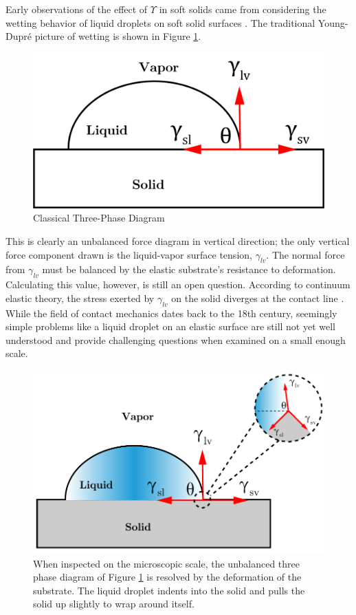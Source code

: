 Early observations of the effect of $ \Upsilon $ in soft solids came from considering the wetting behavior of liquid droplets on soft solid surfaces \cite{xu2017direct,jerison2011deformation,style2013universal,xu2018surface}. The traditional Young-Dupr\'{e} picture of wetting is shown in Figure \ref{fig:three-phase}.
\begin{figure}[h!]
	\centering
	\includegraphics[width=.6\textwidth]{Chapters/Figures/phase_diagram.PNG}
	\caption[Three-Phase Diagram]{Classical Three-Phase Diagram}
	\label{fig:three-phase} 
\end{figure}
This is clearly an unbalanced force diagram in vertical direction; the only vertical force component drawn is the liquid-vapor surface tension, $ \gamma_{lv} $. The normal force from $\gamma_{lv}$ must be balanced by the elastic substrate's resistance to deformation. Calculating this value, however, is still an open question. According to continuum elastic theory, the stress exerted by $\gamma_{lv}$ on the solid diverges at the contact line \cite{jerison2011deformation}. While the field of contact mechanics dates back to the 18th century, seemingly simple problems like a liquid droplet on an elastic surface are still not yet well understood and provide challenging questions when examined on a small enough scale. 

\begin{figure}[h!]
	\centering
	\includegraphics[width=.6\textwidth]{Chapters/Figures/phase_diagram}
	\caption[Three-Phase Diagram: Zoomed]{When inspected on the microscopic scale, the unbalanced three phase diagram of Figure \ref{fig:three-phase} is resolved by the deformation of the substrate. The liquid droplet indents into the solid and pulls the solid up slightly to wrap around itself.}
	\label{fig:three-phase-zoomed} 
\end{figure}

